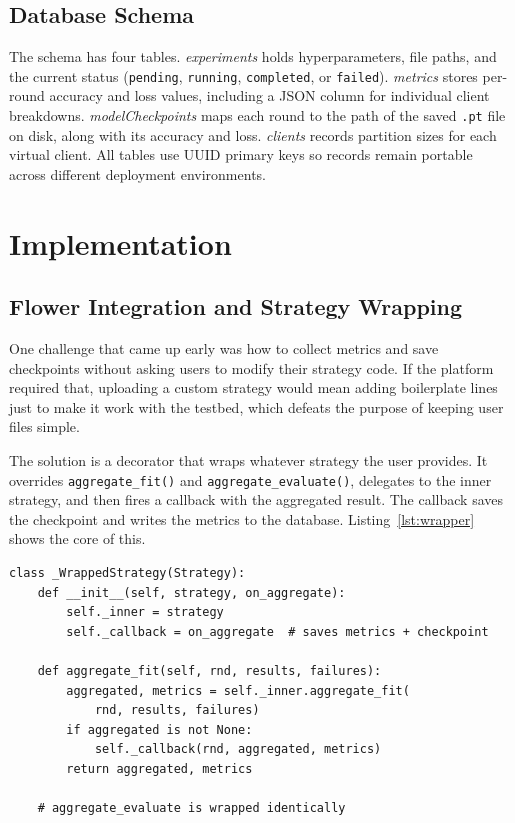 \documentclass[conference]{IEEEtran}
\begin{document}
\subsection{Database Schema}

The schema has four tables.
\textit{experiments} holds hyperparameters, file paths, and the current
status (\texttt{pending}, \texttt{running}, \texttt{completed}, or
\texttt{failed}).
\textit{metrics} stores per-round accuracy and loss values, including a
JSON column for individual client breakdowns.
\textit{modelCheckpoints} maps each round to the path of the saved
\texttt{.pt} file on disk, along with its accuracy and loss.
\textit{clients} records partition sizes for each virtual client.
All tables use UUID primary keys so records remain portable across
different deployment environments.

\section{Implementation}
\label{sec:implementation}

\subsection{Flower Integration and Strategy Wrapping}
\label{sec:impl_flower}

One challenge that came up early was how to collect metrics and save
checkpoints without asking users to modify their strategy code.
If the platform required that, uploading a custom strategy would mean
adding boilerplate lines just to make it work with the testbed, which
defeats the purpose of keeping user files simple.

The solution is a decorator that wraps whatever strategy the user
provides.
It overrides \texttt{aggregate\_fit()} and \texttt{aggregate\_evaluate()},
delegates to the inner strategy, and then fires a callback with the
aggregated result.
The callback saves the checkpoint and writes the metrics to the database.
Listing~\ref{lst:wrapper} shows the core of this.

\begin{lstlisting}[style=pycode, caption={Strategy decorator that intercepts
    aggregation results to save metrics and checkpoints.},
    label=lst:wrapper]
class _WrappedStrategy(Strategy):
    def __init__(self, strategy, on_aggregate):
        self._inner = strategy
        self._callback = on_aggregate  # saves metrics + checkpoint

    def aggregate_fit(self, rnd, results, failures):
        aggregated, metrics = self._inner.aggregate_fit(
            rnd, results, failures)
        if aggregated is not None:
            self._callback(rnd, aggregated, metrics)
        return aggregated, metrics

    # aggregate_evaluate is wrapped identically
\end{lstlisting}
\end{document}
